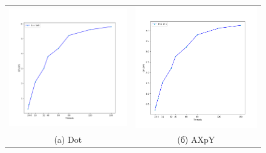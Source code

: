\documentclass[12pt, a4paper]{article}
\begin{document}
\newpage

\begin{figure}[H]
	\center
	\begin{tabular}{cc}
		\includegraphics[width=85mm]{multithread_polus_dot2} & \includegraphics[width=85mm]{multithread_polus_axpy2} \\
		(a) Dot & (б) AXpY \\

\end{tabular}
\end{figure}
\end{document}

